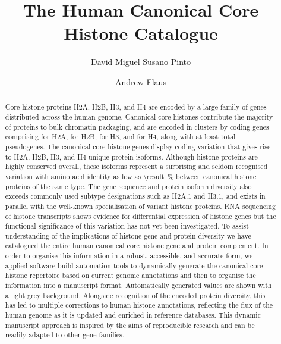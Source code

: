 \documentclass[9pt,lineno]{elife}
\title{The Human Canonical Core Histone Catalogue}
\author[1,\authfn{1}]{David Miguel Susano Pinto}
\author[1]{Andrew Flaus}
\affil[1]{Centre for Chromosome Biology, School of Natural Sciences,
  National University of Ireland Galway, Galway, Ireland}
\begin{document}
  \maketitle

  \begin{abstract}
    Core histone proteins H2A, H2B, H3, and H4 are encoded
    by a large family of genes distributed across the human genome.
    Canonical core histones contribute the majority of proteins to bulk chromatin packaging,
    and are encoded in \NumberOfClusters{} clusters
    by \TotalCoreCodingGenes{} coding genes comprising
    \HTwoACodingGenes{} for H2A,
    \HTwoBCodingGenes{} for H2B,
    \HThreeCodingGenes{} for H3,
    and \HFourCodingGenes{} for H4,
    along with at least \TotalCorePseudoGenes{} total pseudogenes.
    The canonical core histone genes display coding variation that gives rise to
    \HTwoAUniqueProteins{} H2A, \HTwoBUniqueProteins{} H2B,
    \HThreeUniqueProteins{} H3, and \HFourUniqueProteins{} H4 unique protein isoforms.
    Although histone proteins are highly conserved overall,
    these isoforms represent a surprising and seldom recognised variation
    with amino acid identity as low as
     \SI{\result}{\percent}
    between canonical histone proteins of the same type.
    The gene sequence and protein isoform diversity
    also exceeds commonly used subtype designations such as H2A.1 and H3.1,
    and exists in parallel with the well-known specialisation of variant histone proteins.
    RNA sequencing of histone transcripts shows evidence for
    differential expression of histone genes
    but the functional significance of this variation has not yet been investigated.
    To assist understanding of the implications of histone gene and protein diversity
    we have catalogued the entire human canonical core
    histone gene and protein complement.
    In order to organise this information in a
    robust, accessible, and accurate form,
    we applied software build automation tools to
    dynamically generate the canonical core histone repertoire
    based on current genome annotations
    and then to organise the information into a manuscript format.
    Automatically generated values are shown with a light grey background.
    Alongside recognition of the encoded protein diversity,
    this has led to multiple corrections to human histone annotations,
    reflecting the flux of the human genome as it is updated and
    enriched in reference databases.
    This dynamic manuscript approach is inspired by the aims of reproducible research
    and can be readily adapted to other gene families.
  \end{abstract}
\end{document}
